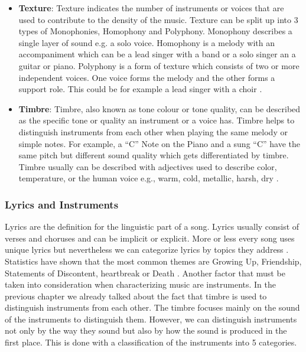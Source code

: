 \begin{itemize}
    \item \textbf{Texture}: Texture indicates the number of instruments or voices that are used
    to contribute to the density of the music. Texture can be split up into 3 types of Monophonies,
    Homophony and Polyphony.
    Monophony describes a single layer of sound e.g. a solo voice.
    Homophony is a melody with an accompaniment which can be a lead singer with a band or a solo
    singer an a guitar or piano.
    Polyphony is a form of texture which consists of two or more independent voices.
    One voice forms the melody and the other forms a support role.
    This could be for example a lead singer with a choir \cite{2019ShawMusic}. 

    \item \textbf{Timbre}: Timbre, also known as tone colour or tone quality,
    can be described as the specific tone or quality an instrument or a voice has.
    Timbre helps to distinguish instruments from each other when playing the same melody or simple notes.
    For example, a “C” Note on the Piano and a sung “C” have the same pitch but different sound
    quality which gets differentiated by timbre.
    Timbre usually can be described with adjectives used to describe color, temperature,
    or the human voice e.g., warm, cold, metallic, harsh, dry \cite[94]{Hemming2015}.

\end{itemize}

\subsubsection{Lyrics and Instruments}

Lyrics are the definition for the linguistic part of a song.
Lyrics usually consist of verses and choruses and can be implicit or explicit.
More or less every song uses unique lyrics but nevertheless we can categorize lyrics by topics they address \cite{Shipman2014Analysis}.
Statistics have shown that the most common themes are Growing Up, Friendship, Statements of Discontent,
heartbreak or Death \cite{2020AIMMListening}.
Another factor that must be taken into consideration when characterizing music are instruments.
In the previous chapter we already talked about the fact that timbre is used to distinguish instruments
from each other.
The timbre focuses mainly on the sound of the instruments to distinguish them.
However, we can distinguish instruments not only by the way they sound but also by how the sound is produced
in the first place.
This is done with a classification of the instruments into 5 categories.

